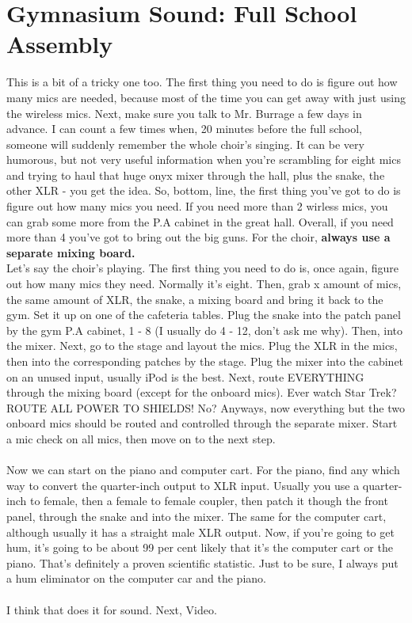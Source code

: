 \documentclass[11pt,a4paper]{book}
\begin{document}
\section{Gymnasium Sound: Full School Assembly}
This is a bit of a tricky one too. The first thing you need to do is figure out how many mics are needed, because most of the time you can get away with just using the wireless mics. Next, make sure you talk to Mr. Burrage a few days in advance. I can count a few times when, 20 minutes before the full school, someone will suddenly remember the whole choir's singing. It can be very humorous, but not very useful information when you're scrambling for eight mics and trying to haul that huge onyx mixer through the hall, plus the snake, the other XLR - you get the idea. So, bottom, line, the first thing you've got to do is figure out how many mics you need. If you need more than 2 wirless mics, you can grab some more from the P.A cabinet in the great hall. Overall, if you need more than 4 you've got to bring out the big guns. For the choir, \textbf{always use a separate mixing board.}
\\
Let's say the choir's playing. The first thing you need to do is, once again, figure out how many mics they need. Normally it's eight. Then, grab x amount of mics, the same amount of XLR, the snake, a mixing board and bring it back to the gym. Set it up on one of the cafeteria tables. Plug the snake into the patch panel by the gym P.A cabinet, 1 - 8 (I usually do 4 - 12, don't ask me why). Then, into the mixer. Next, go to the stage and layout the mics. Plug the XLR in the mics, then into the corresponding patches by the stage. Plug the mixer into the cabinet on an unused input, usually iPod is the best. Next, route EVERYTHING through the mixing board (except for the onboard mics). Ever watch Star Trek? ROUTE ALL POWER TO SHIELDS! No? Anyways, now everything but the two onboard mics should be routed and controlled through the separate mixer. Start a mic check on all mics, then move on to the next step.
\\
\\
Now we can start on the piano and computer cart. For the piano, find any which way to convert the quarter-inch output to XLR input. Usually you use a quarter-inch to female, then a female to female coupler, then patch it though the front panel, through the snake and into the mixer. The same for the computer cart, although usually it has a straight male XLR output. Now, if you're going to get hum, it's going to be about 99 per cent likely that it's the computer cart or the piano. That's definitely a proven scientific statistic. Just to be sure, I always put a hum eliminator on the computer car and the piano.
\\
\\
I think that does it for sound. Next, Video.
\end{document}
